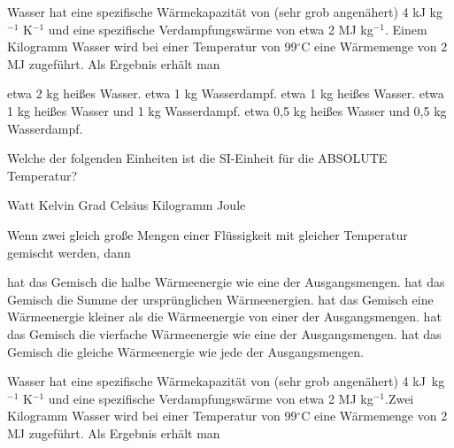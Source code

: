 \documentclass[11pt]{exam}
\begin{document}
\setlength{\voffset}{-0.5in}
\setlength{\headsep}{5pt}

\hspace{2mm}
 \hspace{5mm}
\vspace{4mm}

\begin{questions}

\question Wasser hat eine spezifische Wärmekapazität von (sehr grob angenähert) 4 kJ kg\(^{-1}\) K\(^{-1}\) und eine spezifische Verdampfungswärme von etwa 2 MJ kg\(^{-1}\). Einem Kilogramm Wasser wird bei einer Temperatur von 99\(^\circ\)C eine Wärmemenge von 2 MJ zugeführt. Als Ergebnis erhält man

\begin{choices}
	\choice etwa 2 kg heißes Wasser.
	\choice etwa 1 kg Wasserdampf.
	\choice etwa 1 kg heißes Wasser.
	\choice etwa 1 kg heißes Wasser und 1 kg Wasserdampf.
	\choice etwa 0,5 kg heißes Wasser und 0,5 kg Wasserdampf.
\end{choices}

\vspace{3mm}\question Welche der folgenden Einheiten ist die SI-Einheit für die ABSOLUTE Temperatur?

\begin{choices}
	\choice Watt
	\choice Kelvin
	\choice Grad Celsius
	\choice Kilogramm
	\choice Joule
\end{choices}

\vspace{3mm}\question Wenn zwei gleich große Mengen einer Flüssigkeit mit gleicher Temperatur gemischt werden, dann

\begin{choices}
	\choice hat das Gemisch die halbe Wärmeenergie wie eine der Ausgangsmengen.
	\choice hat das Gemisch die Summe der ursprünglichen Wärmeenergien.
	\choice hat das Gemisch eine Wärmeenergie kleiner als die Wärmeenergie von einer der Ausgangsmengen.
	\choice hat das Gemisch die vierfache Wärmeenergie wie eine der Ausgangsmengen.
	\choice hat das Gemisch die gleiche Wärmeenergie wie jede der Ausgangsmengen.
\end{choices}

\vspace{3mm}\question Wasser hat eine spezifische Wärmekapazität von (sehr grob angenähert) 4 kJ kg\(^{-1}\) K\(^{-1}\) und eine spezifische Verdampfungswärme von etwa 2 MJ kg\(^{-1}\).Zwei Kilogramm Wasser wird bei einer Temperatur von 99\(^\circ\)C eine Wärmemenge von 2 MJ zugeführt. Als Ergebnis erhält man


\end{questions}
\end{document}

